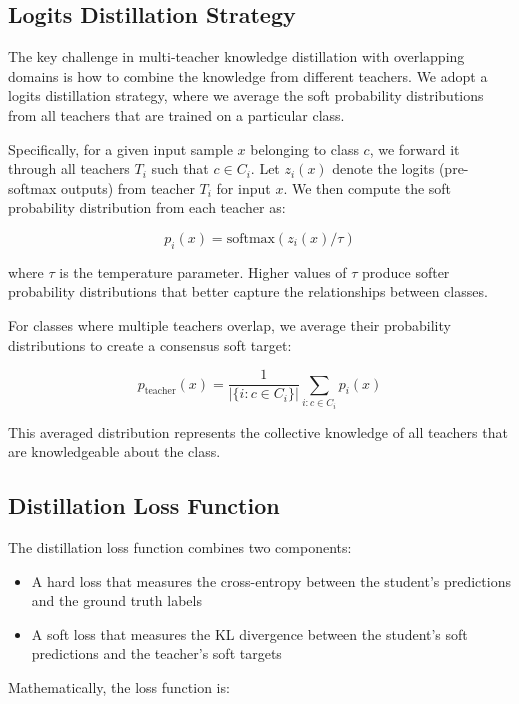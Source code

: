 \documentclass[conference]{IEEEtran}
\begin{document}
\subsection{Logits Distillation Strategy}
The key challenge in multi-teacher knowledge distillation with overlapping domains is how to combine the knowledge from different teachers. We adopt a logits distillation strategy, where we average the soft probability distributions from all teachers that are trained on a particular class.

Specifically, for a given input sample $x$ belonging to class $c$, we forward it through all teachers $T_i$ such that $c \in C_i$. Let $z_i(x)$ denote the logits (pre-softmax outputs) from teacher $T_i$ for input $x$. We then compute the soft probability distribution from each teacher as:

\begin{equation}
p_i(x) = \text{softmax}(z_i(x)/\tau)
\end{equation}

where $\tau$ is the temperature parameter. Higher values of $\tau$ produce softer probability distributions that better capture the relationships between classes.

For classes where multiple teachers overlap, we average their probability distributions to create a consensus soft target:

\begin{equation}
p_{\text{teacher}}(x) = \frac{1}{|\{i: c \in C_i\}|} \sum_{i: c \in C_i} p_i(x)
\end{equation}

This averaged distribution represents the collective knowledge of all teachers that are knowledgeable about the class.

\subsection{Distillation Loss Function}
The distillation loss function combines two components:
\begin{itemize}
    \item A hard loss that measures the cross-entropy between the student's predictions and the ground truth labels
    \item A soft loss that measures the KL divergence between the student's soft predictions and the teacher's soft targets
\end{itemize}

Mathematically, the loss function is:
\end{document}
